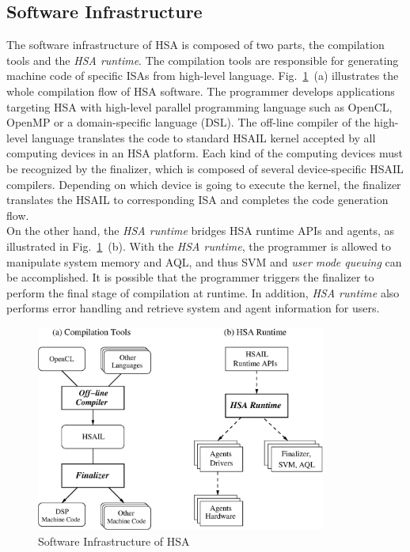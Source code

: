         \subsection{Software Infrastructure}
        The software infrastructure of HSA is composed of two parts, the compilation tools and the \textit{HSA runtime}.   
        The compilation tools are responsible for generating machine code of specific ISAs from high-level language.
        Fig.~\ref{fig:swinf}~(a) illustrates the whole compilation flow of HSA software.
        The programmer develops applications targeting HSA with high-level parallel programming language such as OpenCL, OpenMP or a domain-specific language (DSL).
        The off-line compiler of the high-level language translates the code to standard HSAIL kernel accepted by all computing devices in an HSA platform.
        Each kind of the computing devices must be recognized by the finalizer, 
        which is composed of several device-specific HSAIL compilers.
        Depending on which device is going to execute the kernel, 
        the finalizer translates the HSAIL to corresponding ISA and completes the code generation flow.
        \\\indent
        On the other hand, the \textit{HSA runtime} bridges HSA runtime APIs and agents, as illustrated in Fig.~\ref{fig:swinf}~(b).
        With the \textit{HSA runtime}, the programmer is allowed to manipulate system memory and AQL, 
        and thus SVM and \textit{user mode queuing} can be accomplished.
        It is possible that the programmer triggers the finalizer to perform the final stage of compilation at runtime.
        In addition, \textit{HSA runtime} also performs error handling and retrieve system and agent information for users.
        \vspace{\textfig}
        \begin{figure}[!ht] 
            \centering
            \includegraphics[width=0.85\textwidth]{./figs/swinf.eps}
            \caption{Software Infrastructure of HSA}
            \label{fig:swinf}
        \end{figure}

